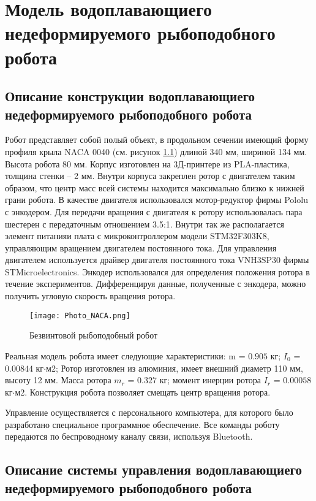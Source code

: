\chapter{Модель водоплавающиего недеформируемого рыбоподобного робота}\label{ch:ch6}

\section{Описание конструкции водоплавающиего недеформируемого рыбоподобного робота}

Робот представляет собой полый объект, в продольном сечении имеющий форму профиля крыла NACA 0040 (см. рисунок \ref{Photo_NACA}) длиной 340 мм, шириной 134 мм. Высота робота 80 мм. Корпус изготовлен на 3Д-принтере из PLA-пластика, толщина стенки -- 2 мм. Внутри корпуса закреплен ротор с двигателем таким образом, что центр масс всей системы находится максимально близко к нижней грани робота. В качестве двигателя использовался мотор-редуктор фирмы Pololu с энкодером. Для передачи вращения с двигателя к ротору использовалась пара шестерен с передаточным отношением 3.5:1. Внутри так же располагается элемент питанияи плата с микроконтроллером модели STM32F303K8, управляющим вращением двигателем постоянного тока. Для управления двигателем используется драйвер двигателя постоянного тока VNH3SP30 фирмы STMicroelectronics. Энкодер использовался для определения положения ротора в течение экспериментов. Дифференцируя данные, полученные с энкодера, можно получить угловую скорость вращения ротора.


\begin{figure}[h]
	\centering
	\texttt{[image: Photo\_NACA.png]}%
	\caption{Безвинтовой рыбоподобный робот}
	\label{Photo_NACA}
\end{figure}

Реальная модель робота имеет следующие характеристики: m = $0.905$ кг; $I_0$ = $0.00844$ кг$\cdot$м2; Ротор изготовлен из алюминия, имеет внешний диаметр 110 мм, высоту 12 мм. Масса ротора $m_r$ = $0.327$ кг; момент инерции ротора $I_r$ = $0.00058$ кг$\cdot$м2. Конструкция робота позволяет смещать центр вращения ротора.

Управление осуществляется с персонального компьютера, для которого было разработано специальное программное обеспечение. Все команды роботу передаются по беспроводному каналу связи, используя Bluetooth.


\section{Описание системы управления водоплавающиего недеформируемого рыбоподобного робота}


\clearpage